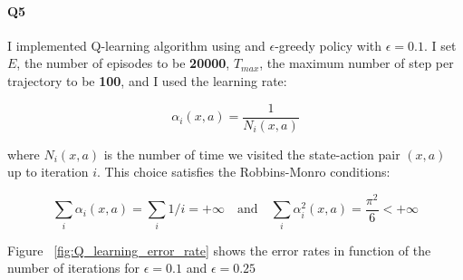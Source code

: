\documentclass[11pt]{article}
\numberwithin{figure}{section} %
\begin{document}
\paragraph{Q5} I implemented Q-learning algorithm using and $\epsilon$-greedy policy with $\epsilon = 0.1$. I set $E$, the number of episodes to be \textbf{20000}, $T_{max}$, the maximum number of step per trajectory to be \textbf{100}, and I used the learning rate:

$$\alpha_i(x,a) = \frac{1}{N_i(x,a)}$$

where $N_i(x,a)$ is the number of time we visited the state-action pair $(x,a)$ up to iteration $i$. This choice satisfies the Robbins-Monro conditions:

$$\sum\limits_{i} \alpha_i(x,a) = \sum\limits_{i} 1/i = + \infty \quad \text{and} \quad \sum\limits_{i} \alpha_{i}^{2}(x,a) = \frac{\pi^2}{6} < + \infty$$

Figure ~\ref{fig:Q_learning_error_rate} shows the error rates in function of the number of iterations for $\epsilon = 0.1$ and $\epsilon = 0.25$
\end{document}
